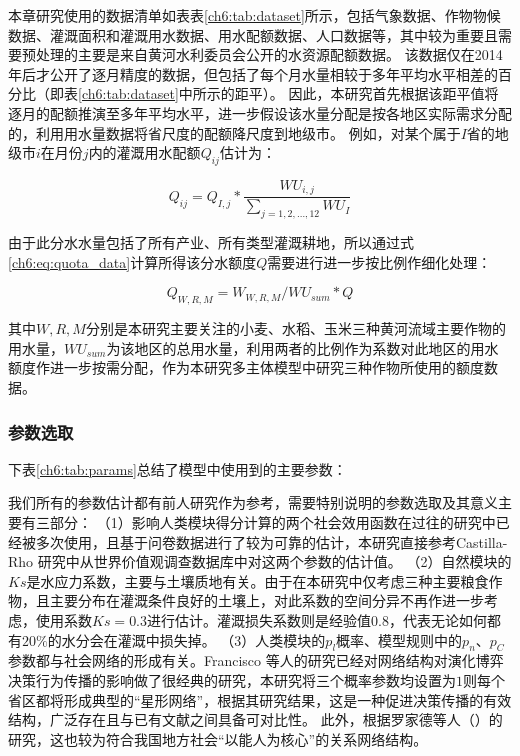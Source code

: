 本章研究使用的数据清单如表表\ref{ch6:tab:dataset}所示，包括气象数据、作物物候数据、灌溉面积和灌溉用水数据、用水配额数据、人口数据等，其中较为重要且需要预处理的主要是来自黄河水利委员会公开的水资源配额数据。
该数据仅在2014年后才公开了逐月精度的数据，但包括了每个月水量相较于多年平均水平相差的百分比（即表\ref{ch6:tab:dataset}中所示的距平）。
因此，本研究首先根据该距平值将逐月的配额推演至多年平均水平，进一步假设该水量分配是按各地区实际需求分配的，利用用水量数据将省尺度的配额降尺度到地级市。
例如，对某个属于$I$省的地级市$i$在月份$j$内的灌溉用水配额$Q_{ij}$估计为：

\begin{equation}
    \label{ch6:eq:quota_data}
    Q_{ij} = Q_{I, j} * \frac{WU_{i, j}}{\sum_{j = 1, 2, \dots, 12} WU_{I}}
\end{equation}

由于此分水水量包括了所有产业、所有类型灌溉耕地，所以通过式\ref{ch6:eq:quota_data}计算所得该分水额度$Q$需要进行进一步按比例作细化处理：

\begin{equation}
    Q_{W, R, M} = W_{W, R, M} / WU_{sum} * Q
\end{equation}

其中$W, R, M$分别是本研究主要关注的小麦、水稻、玉米三种黄河流域主要作物的用水量，$WU_{sum}$为该地区的总用水量，利用两者的比例作为系数对此地区的用水额度作进一步按需分配，作为本研究多主体模型中研究三种作物所使用的额度数据。



\subsubsection*{参数选取}

下表\ref{ch6:tab:params}总结了模型中使用到的主要参数：



我们所有的参数估计都有前人研究作为参考，需要特别说明的参数选取及其意义主要有三部分：
（1）影响人类模块得分计算的两个社会效用函数在过往的研究中已经被多次使用，且基于问卷数据进行了较为可靠的估计，本研究直接参考Castilla-Rho 研究中从世界价值观调查数据库中对这两个参数的估计值\cite{castilla-rho2015, castilla-rho2017, castilla-rho2020}。
（2）自然模块的$Ks$是水应力系数，主要与土壤质地有关。由于在本研究中仅考虑三种主要粮食作物，且主要分布在灌溉条件良好的土壤上，对此系数的空间分异不再作进一步考虑，使用系数$Ks = 0.3$进行估计。灌溉损失系数则是经验值$0.8$，代表无论如何都有$20\%$的水分会在灌溉中损失掉。
（3）人类模块的$p_l$概率、模型规则中的$p_n$、$p_C$参数都与社会网络的形成有关。Francisco 等人的研究已经对网络结构对演化博弈决策行为传播的影响做了很经典的研究，本研究将三个概率参数均设置为$1$则每个省区都将形成典型的“星形网络”，根据其研究结果，这是一种促进决策传播的有效结构，广泛存在且与已有文献之间具备可对比性\cite{santos2008}。
此外，根据罗家德等人（）的研究，这也较为符合我国地方社会“以能人为核心”的关系网络结构。 %

